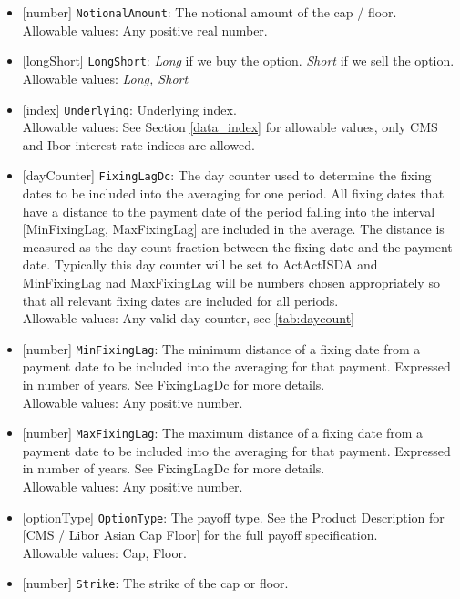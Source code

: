 \begin{itemize}
    \item{}[number] \lstinline!NotionalAmount!: The notional amount of the cap / floor. \\
    Allowable values: Any positive real number.
    \item{}[longShort] \lstinline!LongShort!: \emph{Long} if we buy the option. \emph{Short} if we sell the option.
    Allowable values: \emph{Long, Short}
  \item{}[index] \lstinline!Underlying!: Underlying index. \\
    Allowable values: See Section \ref{data_index} for allowable values, only CMS and Ibor interest rate indices are allowed.
  \item{}[dayCounter] \lstinline!FixingLagDc!: The day counter used to determine the fixing dates to be included into the averaging
    for one period. All fixing dates that have a distance to the payment date of the period falling into the interval
    [MinFixingLag, MaxFixingLag] are included in the average. The distance is measured as the day count fraction between
    the fixing date and the payment date. Typically this day counter will be set to ActActISDA and MinFixingLag nad
    MaxFixingLag will be numbers chosen appropriately so that all relevant fixing dates are included for all periods. \\
    Allowable values: Any valid day counter, see \ref{tab:daycount}
  \item{}[number] \lstinline!MinFixingLag!: The minimum distance of a fixing date from a payment date to be included into the
    averaging for that payment. Expressed in number of years. See FixingLagDc for more details.\\
    Allowable values: Any positive number.
  \item{}[number] \lstinline!MaxFixingLag!: The maximum distance of a fixing date from a payment date to be included into the
    averaging for that payment. Expressed in number of years. See FixingLagDc for more details.\\
    Allowable values: Any positive number.
  \item{}[optionType] \lstinline!OptionType!: The payoff type. See the Product Description for [CMS / Libor Asian Cap Floor] for the full payoff specification.\\
    Allowable values: Cap, Floor.
  \item{}[number] \lstinline!Strike!: The strike of the cap or floor.\\

\end{itemize}

